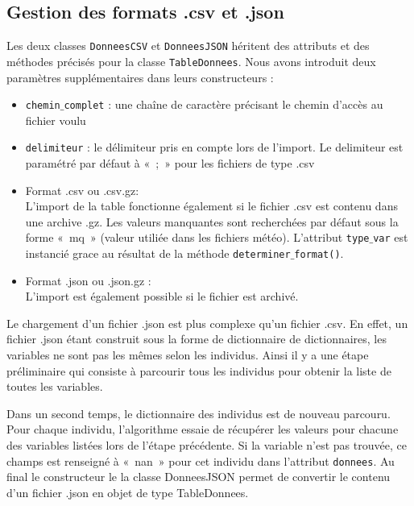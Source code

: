 \documentclass[11pt]{article}
\begin{document}
\subsection{Gestion des formats .csv et .json}

Les deux classes \texttt{DonneesCSV} et \texttt{DonneesJSON} héritent des attributs et des méthodes précisés pour la classe \texttt{TableDonnees}. Nous avons introduit deux paramètres supplémentaires dans leurs constructeurs : 
\begin{itemize}
    \item \texttt{chemin$\_$complet} : une chaîne de caractère précisant le chemin d'accès au fichier voulu
    \item \texttt{delimiteur} : le délimiteur pris en compte lors de l'import. Le delimiteur est paramétré par défaut à «~;~» pour les fichiers de type .csv
\end{itemize}

\begin{itemize}[label=, font=\large]
    \item Format .csv ou .csv.gz: \\ L'import de la table fonctionne également si le fichier .csv est contenu dans une archive .gz. Les valeurs manquantes sont recherchées par défaut sous la forme «~mq~» (valeur utiliée dans les fichiers météo). L'attribut \texttt{type$\_$var} est instancié grace au résultat de la méthode \texttt{determiner$\_$format()}.
    \item Format .json ou .json.gz : \\ L'import est également possible si le fichier est archivé.
\end{itemize}

\bigbreak
Le chargement d'un fichier .json est plus complexe qu'un fichier .csv. En effet, un fichier .json étant construit sous la forme de dictionnaire de dictionnaires, les variables ne sont pas les mêmes selon les individus. Ainsi il y a une étape préliminaire qui consiste à parcourir tous les individus pour obtenir la liste de toutes les variables.

\bigbreak

Dans un second temps, le dictionnaire des individus est de nouveau parcouru. Pour chaque individu, l'algorithme essaie de récupérer les valeurs pour chacune des variables listées lors de l'étape précédente. Si la variable n'est pas trouvée, ce champs est renseigné à «~nan~» pour cet individu dans l'attribut \texttt{donnees}. Au final le constructeur le la classe DonneesJSON permet de convertir le contenu d'un fichier .json en objet de type TableDonnees.
\end{document}
